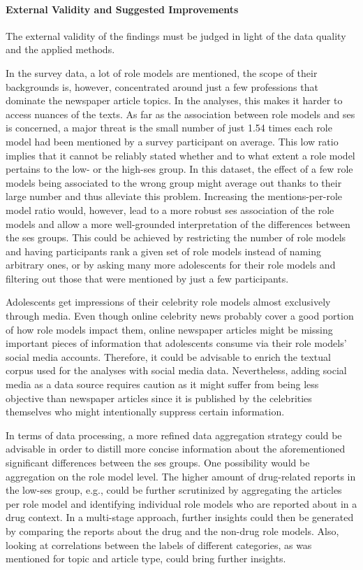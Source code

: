 \paragraph{External Validity and Suggested Improvements}
The external validity of the findings must be judged in light of the data quality and the applied methods.

In the survey data, a lot of role models are mentioned, the scope of their backgrounds is, however, concentrated around just a few professions that dominate the newspaper article topics. In the analyses, this makes it harder to access nuances of the texts. As far as the association between role models and \gls{ses} is concerned, a major threat is the small number of just \SI{1.54}{} times each role model had been mentioned by a survey participant on average. This low ratio implies that it cannot be reliably stated whether and to what extent a role model pertains to the low- or the high-\gls{ses} group. In this dataset, the effect of a few role models being associated to the wrong group might average out thanks to their large number and thus alleviate this problem. Increasing the mentions-per-role model ratio would, however, lead to a more robust \gls{ses} association of the role models and allow a more well-grounded interpretation of the differences between the \gls{ses} groups. This could be achieved by restricting the number of role models and having participants rank a given set of role models instead of naming arbitrary ones, or by asking many more adolescents for their role models and filtering out those that were mentioned by just a few participants.

Adolescents get impressions of their celebrity role models almost exclusively through media. Even though online celebrity news probably cover a good portion of how role models impact them, online newspaper articles might be missing important pieces of information that adolescents consume via their role models' social media accounts. Therefore, it could be advisable to enrich the textual corpus used for the analyses with social media data. Nevertheless, adding social media as a data source requires caution as it might suffer from being less objective than newspaper articles since it is published by the celebrities themselves who might intentionally suppress certain information.

In terms of data processing, a more refined data aggregation strategy could be advisable in order to distill more concise information about the aforementioned significant differences between the \gls{ses} groups. One possibility would be aggregation on the role model level. The higher amount of drug-related reports in the low-\gls{ses} group, e.g., could be further scrutinized by aggregating the articles per role model and identifying individual role models who are reported about in a drug context. In a multi-stage approach, further insights could then be generated by comparing the reports about the drug and the non-drug role models. Also, looking at correlations between the labels of different categories, as was mentioned for topic and article type, could bring further insights.

